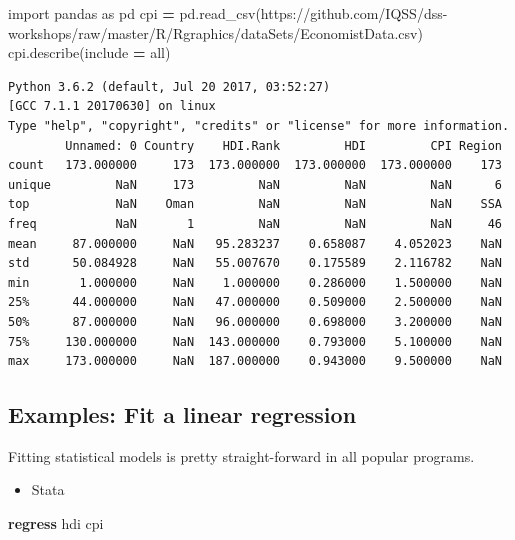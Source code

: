 \documentclass[
]{book}
\newenvironment{Shaded}{\begin{snugshade}}{\end{snugshade}}
\newcommand{\ImportTok}[1]{#1}
\newcommand{\KeywordTok}[1]{\textcolor[rgb]{0.13,0.29,0.53}{\textbf{#1}}}
\newcommand{\NormalTok}[1]{#1}
\newcommand{\OperatorTok}[1]{\textcolor[rgb]{0.81,0.36,0.00}{\textbf{#1}}}
\newcommand{\StringTok}[1]{\textcolor[rgb]{0.31,0.60,0.02}{#1}}
\providecommand{\tightlist}{%
  \setlength{\itemsep}{0pt}\setlength{\parskip}{0pt}}
\begin{document}
\begin{Shaded}
\begin{Highlighting}[]
\ImportTok{import}\NormalTok{ pandas }\ImportTok{as}\NormalTok{ pd}
\NormalTok{cpi }\OperatorTok{=}\NormalTok{ pd.read\_csv(}\StringTok{\textquotesingle{}https://github.com/IQSS/dss{-}workshops/raw/master/R/Rgraphics/dataSets/EconomistData.csv\textquotesingle{}}\NormalTok{)}
\NormalTok{cpi.describe(include }\OperatorTok{=} \StringTok{\textquotesingle{}all\textquotesingle{}}\NormalTok{)}
\end{Highlighting}
\end{Shaded}

\begin{verbatim}
Python 3.6.2 (default, Jul 20 2017, 03:52:27) 
[GCC 7.1.1 20170630] on linux
Type "help", "copyright", "credits" or "license" for more information.
        Unnamed: 0 Country    HDI.Rank         HDI         CPI Region
count   173.000000     173  173.000000  173.000000  173.000000    173
unique         NaN     173         NaN         NaN         NaN      6
top            NaN    Oman         NaN         NaN         NaN    SSA
freq           NaN       1         NaN         NaN         NaN     46
mean     87.000000     NaN   95.283237    0.658087    4.052023    NaN
std      50.084928     NaN   55.007670    0.175589    2.116782    NaN
min       1.000000     NaN    1.000000    0.286000    1.500000    NaN
25%      44.000000     NaN   47.000000    0.509000    2.500000    NaN
50%      87.000000     NaN   96.000000    0.698000    3.200000    NaN
75%     130.000000     NaN  143.000000    0.793000    5.100000    NaN
max     173.000000     NaN  187.000000    0.943000    9.500000    NaN
\end{verbatim}

\hypertarget{examples-fit-a-linear-regression}{%
\subsection{Examples: Fit a linear regression}\label{examples-fit-a-linear-regression}}

Fitting statistical models is pretty straight-forward in all popular programs.

\begin{itemize}
\tightlist
\item
  Stata
\end{itemize}

\begin{Shaded}
\begin{Highlighting}[]
\KeywordTok{regress}\NormalTok{ hdi cpi}
\end{Highlighting}
\end{Shaded}
\end{document}
